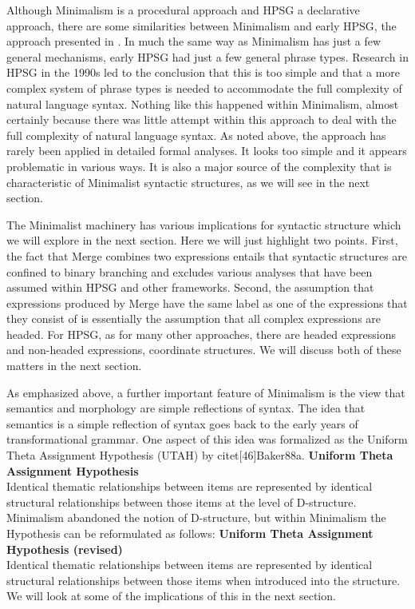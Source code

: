 \documentclass[output=paper]{langsci/langscibook}
\begin{document}
Although Minimalism is a procedural approach and HPSG a declarative approach, there are some similarities between Minimalism and early HPSG, the approach presented in \citet{ps,ps2}. In much the same way as Minimalism has just a few general mechanisms, early HPSG had just a few general phrase types. Research in HPSG in the 1990s led to the conclusion that this is too simple and that a more complex system of phrase types is needed to accommodate the full complexity of natural language syntax. Nothing like this happened within Minimalism, almost certainly because there was little attempt within this approach to deal with the full complexity of natural language syntax. As noted above, the approach has rarely been applied in detailed formal analyses. It looks too simple and it appears problematic in various ways. It is also a major source of the complexity that is characteristic of Minimalist syntactic structures, as we will see in the next section.

The Minimalist machinery has various implications for syntactic structure which we will explore in the next section. Here we will just highlight two points. First, the fact that Merge combines two expressions entails that syntactic structures are confined to binary branching and excludes various analyses that have been assumed within HPSG and other frameworks. Second, the assumption that expressions produced by Merge have the same label as one of the expressions that they consist of is essentially the assumption that all complex expressions are headed. For HPSG, as for many other approaches, there are headed expressions and non-headed expressions, \eg coordinate structures. We will discuss both of these matters in the next section.

As emphasized above, a further important feature of Minimalism is the view that semantics and morphology are simple reflections of syntax. The idea that semantics is a simple reflection of syntax goes back to the early years of transformational grammar. One aspect of this idea was formalized as the Uniform Theta Assignment Hypothesis (UTAH) by citet[46]{Baker88a}.
\ea\label{ex:min-UTAH}
\textbf{Uniform Theta Assignment Hypothesis}\\
Identical thematic relationships between items are represented by identical structural relationships between those items at the level of D-structure.
\z
Minimalism abandoned the notion of D-structure, but within Minimalism the Hypothesis can be reformulated as follows:
\ea\label{ex:min-UTAH-revised}
\textbf{Uniform Theta Assignment Hypothesis (revised)}\\
Identical thematic relationships between items are represented by identical structural relationships between those items when introduced into the structure.
\z
We will look at some of the implications of this in the next section.
\end{document}

